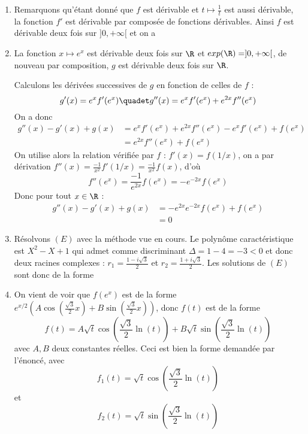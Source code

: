 \documentclass[a4paper, 11pt,reqno]{article}
\begin{document}
\begin{correction}
\begin{enumerate}
\item Remarquons qu'étant donné que $f$ est dérivable et $t\mapsto \frac{1}{t}$ est aussi dérivable, la fonction $f'$ est dérivable par composée de fonctions dérivables. Ainsi $f$ est dérivable deux fois sur $]0,+\infty[$ et on a 

\item La fonction $x\mapsto e^x$ est dérivable deux fois sur $\R$ et $exp(\R) = ]0,+\infty[$, de nouveau par composition, $g$ est dérivable deux fois sur $\R$. 

Calculons les dérivées successives de $g$ en fonction de celles de $f$ :
$$g'(x) = e^x f'(e^x) \quadet g''(x) = e^xf'(e^x) +e^{2x} f''(e^x)$$
On  a donc 
\begin{align*}
g''(x)-g'(x)+g(x)  &= e^xf'(e^x) +e^{2x} f''(e^x)-e^x f'(e^x)+f(e^{x})\\
						&= e^{2x} f''(e^x)+f(e^{x})
\end{align*}
On utilise alors la relation vérifiée par $f$ : $f'(x) = f(1/x)$, on a par dérivation $f''(x) = \frac{-1}{x^2}f'(1/x)  = \frac{-1}{x^2}f(x)$, d'où 
$$f''(e^x) = \frac{-1}{e^{2x}}f(e^{x})=-e^{-2x} f(e^x)$$
Donc pour tout $x\in \R$ :
\begin{align*}
g''(x)-g'(x)+g(x)  &=  -e^{2x}e^{-2x} f(e^x) +f(e^x)\\
							&=0
\end{align*}

\item Résolvons $(E)$ avec la méthode vue en cours. Le polynôme caractéristique est 
$X^2-X+1$ qui admet comme discriminant $\Delta = 1-4 =-3<0$ et donc deux racines complexes : $r_1=\frac{1-i\sqrt{3}}{2}$ et $r_2=\frac{1+i\sqrt{3}}{2}$. 
Les solutions de $(E)$ sont donc de la forme 

\item On vient de voir que $f(e^{x})$ est de la forme $e^{x/2} (A\cos\left(\frac{\sqrt{3}}{2}x\right)+B\sin\left(\frac{\sqrt{3}}{2}x\right)) $, donc 
$f(t) $ est de la forme 
$$f(t) = A \sqrt{t}  \cos\left(\frac{\sqrt{3}}{2}\ln(t)\right) +B\sqrt{t}  \sin\left(\frac{\sqrt{3}}{2}\ln(t)\right)$$
avec $A,B$ deux constantes réelles. Ceci est bien la forme demandée par l'énoncé, avec 
$$f_1(t) = \sqrt{t}  \cos\left(\frac{\sqrt{3}}{2}\ln(t)\right)$$ et 
$$f_2(t) = \sqrt{t}  \sin\left(\frac{\sqrt{3}}{2}\ln(t)\right)$$


\end{enumerate}
\end{correction}
\end{document}
